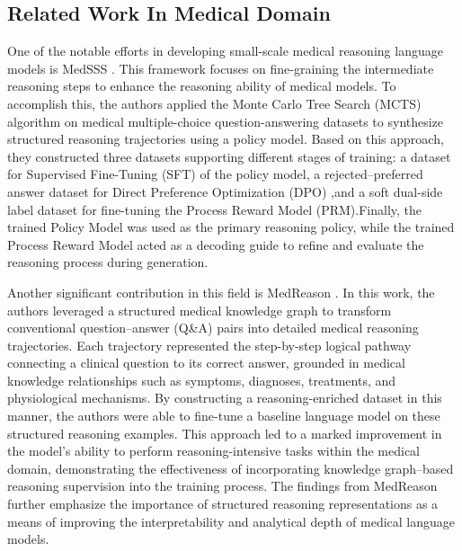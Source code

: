 \documentclass[conference]{IEEEtran}
\begin{document}
	\subsection{Related Work In Medical Domain}
One of the notable efforts in developing small-scale medical reasoning language models is MedSSS
\cite{b11}.
This framework focuses on fine-graining the intermediate reasoning steps to enhance the reasoning ability of medical models. To accomplish this, the authors applied the Monte Carlo Tree Search (MCTS)
\cite{b12}
algorithm on medical multiple-choice question-answering datasets to synthesize structured reasoning trajectories using a policy model. Based on this approach, they constructed three datasets supporting different stages of training: a dataset for Supervised Fine-Tuning (SFT) of the policy model, a rejected–preferred answer dataset for Direct Preference Optimization (DPO)
\cite{b13}
,and a soft dual-side label dataset for fine-tuning the Process Reward Model (PRM).Finally, the trained Policy Model was used as the primary reasoning policy, while the trained Process Reward Model acted as a decoding guide to refine and evaluate the reasoning process during generation.

Another significant contribution in this field is MedReason
\cite{b14}. 
In this work, the authors leveraged a structured medical knowledge graph to transform conventional question–answer (Q\&A) pairs into detailed medical reasoning trajectories. Each trajectory represented the step-by-step logical pathway connecting a clinical question to its correct answer, grounded in medical knowledge relationships such as symptoms, diagnoses, treatments, and physiological mechanisms. By constructing a reasoning-enriched dataset in this manner, the authors were able to fine-tune a baseline language model on these structured reasoning examples. This approach led to a marked improvement in the model’s ability to perform reasoning-intensive tasks within the medical domain, demonstrating the effectiveness of incorporating knowledge graph–based reasoning supervision into the training process. The findings from MedReason further emphasize the importance of structured reasoning representations as a means of improving the interpretability and analytical depth of medical language models.
\end{document}
